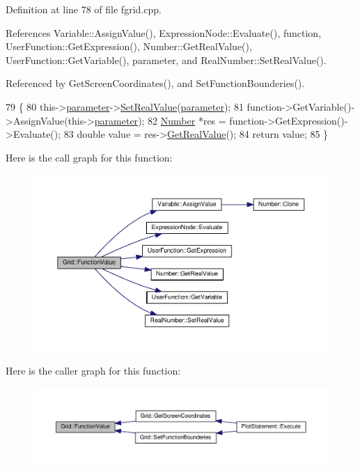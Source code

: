Definition at line 78 of file fgrid.\+cpp.



References Variable\+::\+Assign\+Value(), Expression\+Node\+::\+Evaluate(), function, User\+Function\+::\+Get\+Expression(), Number\+::\+Get\+Real\+Value(), User\+Function\+::\+Get\+Variable(), parameter, and Real\+Number\+::\+Set\+Real\+Value().



Referenced by Get\+Screen\+Coordinates(), and Set\+Function\+Bounderies().


\begin{DoxyCode}
79 \{
80     this->\hyperlink{classGrid_a37df3261f985852f871847769c8b833c}{parameter}->\hyperlink{structRealNumber_a47b13da91334faba56ece7292f3a8566}{SetRealValue}(\hyperlink{classGrid_a37df3261f985852f871847769c8b833c}{parameter});
81     \textcolor{keyword}{function}->GetVariable()->AssignValue(this->\hyperlink{classGrid_a37df3261f985852f871847769c8b833c}{parameter});
82     \hyperlink{structNumber}{Number} *res = \textcolor{keyword}{function}->GetExpression()->Evaluate();
83     \textcolor{keywordtype}{double} value = res->\hyperlink{structNumber_a83da654d465f1344162ce8b8f8c564b9}{GetRealValue}();
84     \textcolor{keywordflow}{return} value;
85 \}
\end{DoxyCode}


Here is the call graph for this function\+:
\nopagebreak
\begin{figure}[H]
\begin{center}
\leavevmode
\includegraphics[width=350pt]{d0/daf/classGrid_a9e403482f403a28e3a152b435526829b_cgraph}
\end{center}
\end{figure}




Here is the caller graph for this function\+:
\nopagebreak
\begin{figure}[H]
\begin{center}
\leavevmode
\includegraphics[width=350pt]{d0/daf/classGrid_a9e403482f403a28e3a152b435526829b_icgraph}
\end{center}
\end{figure}


